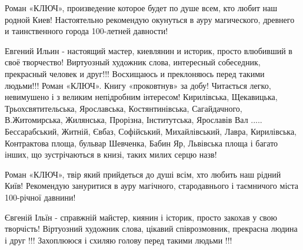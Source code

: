 Роман «КЛЮЧ», произведение которое будет по душе всем, кто любит наш родной
Киев! Настоятельно рекомендую окунуться в ауру магического, древнего и
таинственного города 100-летней давности!

Евгений Ильин - настоящий мастер, киевлянин и историк, просто влюбивший в своё
творчество! Виртуозный художник слова, интересный собеседник, прекрасный
человек и друг!!! Восхищаюсь и преклоняюсь перед такими людьми!!! Роман
«КЛЮЧ». Книгу «проковтнув» за добу! Читається легко, невимушено і з великим
непідробним інтересом! Кирилівська, Щекавицька, Трьохсвятительська,
Ярославська, Костянтинівська, Сагайдачного, В.Житомирська, Жилянська,
Прорізна, Інститутська, Ярославів Вал ..... Бессарабський, Житній, Євбаз,
Софійський, Михайлівський, Лавра, Кирилівська, Контрактова площа, бульвар
Шевченка, Бабин Яр, Львівська площа і багато інших, що зустрічаються в книзі,
таких милих серцю назв!

Роман «КЛЮЧ», твір який прийдеться до душі всім, хто любить наш рідний Київ!
Рекомендую зануритися в ауру магічного, стародавнього і таємничого міста
100-річної давнини!

Євгеній Ільїн - справжній майстер, киянин і історик, просто закохав у свою
творчість! Віртуозний художник слова, цікавий співрозмовник, прекрасна людина і
друг !!! Захоплююся і схиляю голову перед такими людьми !!!
